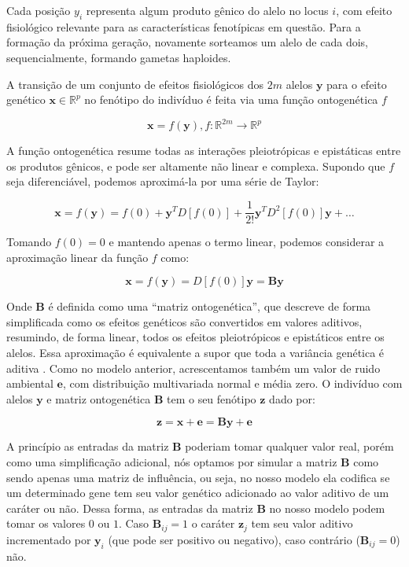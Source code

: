 Cada posição $y_i$ representa algum produto gênico do alelo no
locus $i$, com efeito fisiológico relevante para as características
fenotípicas em questão.
Para a formação da próxima geração, novamente sorteamos um alelo de cada
dois, sequencialmente, formando gametas haploides.

A transição de um conjunto de efeitos fisiológicos dos $2m$ alelos
$\mathbf{y}$ para o efeito genético $\mathbf{x} \in \mathbb{R}^p$  no
fenótipo do indivíduo é feita via uma função ontogenética $f$

\begin{equation}
    \mathbf{x} = f(\mathbf{y}), f:\mathbb{R}^{2m} \rightarrow \mathbb{R}^{p}
\end{equation}

A função ontogenética resume todas as interações pleiotrópicas e
epistáticas entre os produtos gênicos, e pode ser altamente não linear e complexa.
Supondo que $f$ seja diferenciável, podemos aproximá-la por uma série de
Taylor:

\begin{equation}
\mathbf{x} = f(\mathbf{y}) = f(0) + \mathbf{y}^T D[f(0)] + \frac{1}{2!} \mathbf{y}^T D^2 [f(0)] \mathbf{y} + \ldots
\end{equation}

Tomando $f(0) = 0$ e mantendo apenas o termo linear, podemos considerar
a aproximação linear da função $f$ como:

\begin{equation}
    \mathbf{x} = f(\mathbf{y}) = D[f(0)]\mathbf{y} = \mathbf{B}\mathbf{y}
\end{equation}

Onde $\mathbf{B}$ é definida como uma ``matriz ontogenética'', que descreve de
forma simplificada como os efeitos genéticos são convertidos em 
valores aditivos, resumindo, de forma linear, todos os efeitos pleiotrópicos e
epistáticos entre os alelos.
Essa aproximação é equivalente a supor que toda a variância genética é aditiva \citep{Wagner1989}.
Como no modelo anterior, acrescentamos também um valor de ruido
ambiental $\mathbf{e}$, com distribuição multivariada normal e média zero.
O indivíduo com alelos $\mathbf{y}$ e matriz ontogenética $\mathbf{B}$
tem o seu fenótipo $\mathbf{z}$ dado por:

\begin{equation}
    \mathbf{z} = \mathbf{x} + \mathbf{e} = \mathbf{By} + \mathbf{e}
\label{matrizB}
\end{equation}

A princípio as entradas da matriz $\mathbf{B}$ poderiam tomar qualquer
valor real, porém como uma simplificação adicional, nós optamos por
simular a matriz $\mathbf{B}$ como sendo apenas uma matriz de
influência, ou seja, no nosso modelo ela codifica se um determinado gene
tem seu valor genético adicionado ao valor aditivo de um caráter ou não.
Dessa forma, as entradas da matriz $\mathbf{B}$ no nosso modelo podem
tomar os valores $0$ ou $1$.
Caso $\mathbf{B}_{ij} = 1$ o caráter $\mathbf{z}_j$ tem seu valor
aditivo incrementado por $\mathbf{y}_i$ (que pode ser positivo ou
negativo), caso contrário ($\mathbf{B}_{ij} = 0$) não.

